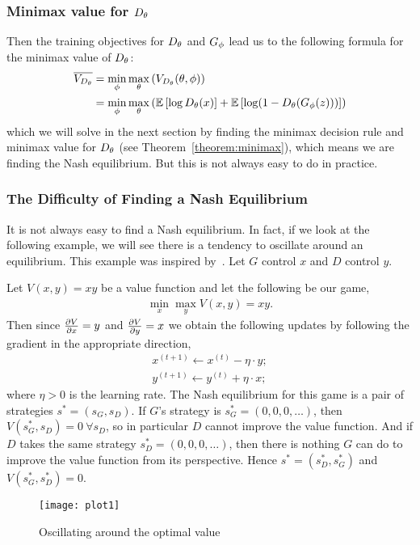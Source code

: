 \subsubsection{Minimax value for $D_\theta$}

Then the training objectives for $D_\theta$ and $G_\phi$ lead us to the
following formula for the minimax value of $D_\theta$:
\begin{align}
  \overline{V_{D_\theta}} & = \min_{\phi}\max_{\theta}\left(V_{D_\theta}(\theta,
                      \phi) \right) \\
                    & =
                      \min_{\phi}\max_{\theta}\left(\mathbb{E}\left[\log{D_\theta(x)}\right]
                      +
                      \mathbb{E}\left[\log(1 - D_\theta(G_\phi(z)))\right] \right)
\end{align}
which we will solve in the next section by finding the minimax
decision rule and minimax value for $D_\theta$ (see
Theorem~\ref{theorem:minimax}), which means we are finding the Nash
equilibrium.  But this is not always easy to do in practice.

\subsubsection{The Difficulty of Finding a Nash Equilibrium}
\label{sec:difficulty}

It is not always easy to find a Nash equilibrium. In fact, if we look at the
following example, we will see there is a tendency to oscillate around an
equilibrium. This example was inspired by~\cite{ref:weng-2017}. Let $G$ control
$x$ and $D$ control $y$.

\begin{example}
  Let $V(x, y) = xy$ be a value function and let the following be our
  game,
  \begin{align}
    \min_x\max_yV(x, y) = xy.
  \end{align}
  Then since ${\partial{V} \over \partial{x}} = y$ and
  ${\partial{V} \over \partial{y}} = x$ we obtain the following
  updates by following the gradient in the appropriate direction,
  \begin{align}
    x^{(t+1)} \gets x^{(t)} - \eta \cdot y; \\
    y^{(t+1)} \gets y^{(t)} + \eta \cdot x;
  \end{align}
  where $\eta > 0$ is the learning rate. The Nash equilibrium for this
  game is a pair of strategies $s^* = (s_G, s_D)$. If $G$'s strategy
  is $s^*_G = (0, 0, 0, \dots)$, then $V(s^*_G, s_D) = 0\ \forall s_D$, so
  in particular $D$ cannot improve the value function.  And if $D$
  takes the same strategy $s^*_D = (0, 0, 0, \dots)$, then there is
  nothing $G$ can do to improve the value function from its
  perspective.  Hence $s^* = (s^*_D, s^*_G)$ and $V(s^*_G, s^*_D) = 0$.

  \begin{figure}[H]
    \centering
    \texttt{[image: plot1]}
    \caption{Oscillating around the optimal value}
    \label{fig:alternating}
  \end{figure}
\end{example}


